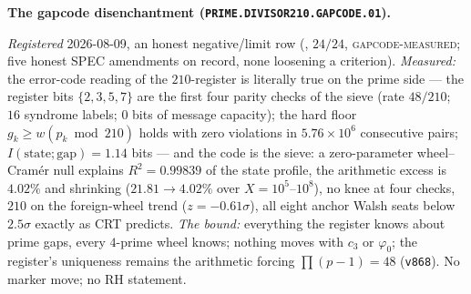 \par\smallskip\noindent\textbf{The gapcode disenchantment
(\texttt{PRIME.DIVISOR210.\allowbreak GAPCODE.01}).}
{\sloppy
\emph{Registered} 2026-08-09, an honest negative/limit row
(, $24/24$,
\textsc{gapcode-measured}; five honest SPEC amendments on
record, none loosening a criterion).  \emph{Measured:} the
error-code reading of the $210$-register is literally true on
the prime side --- the register bits $\{2,3,5,7\}$ are the first
four parity checks of the sieve (rate $48/210$; $16$ syndrome
labels; $0$ bits of message capacity); the hard floor $g_k \ge
w(p_k \bmod 210)$ holds with zero violations in
$5.76\times10^{6}$ consecutive pairs;
$I(\text{state};\text{gap}) = 1.14$ bits --- and the code is the
sieve: a zero-parameter wheel--Cram\'er null explains $R^2 =
0.99839$ of the state profile, the arithmetic excess is $4.02\%$
and shrinking ($21.81 \to 4.02\%$ over $X = 10^5$--$10^8$), no
knee at four checks, $210$ on the foreign-wheel trend ($z =
-0.61\sigma$), all eight anchor Walsh seats below $2.5\sigma$
exactly as CRT predicts.  \emph{The bound:} everything the
register knows about prime gaps, every $4$-prime wheel knows;
nothing moves with $c_3$ or $\varphi_0$; the register's
uniqueness remains the arithmetic forcing $\prod(p-1) = 48$
(\texttt{v868}).  No marker move; no RH statement.\par}


